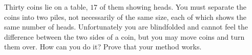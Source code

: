 Thirty coins lie on a table, $17$ of them showing heads. You must separate the coins into two piles, not necessarily of the same size, each of which shows the same number of heads. Unfortunately you are blindfolded and cannot feel the difference between the two sides of a coin, but you may move coins and turn them over. How can you do it? Prove that your method works.
